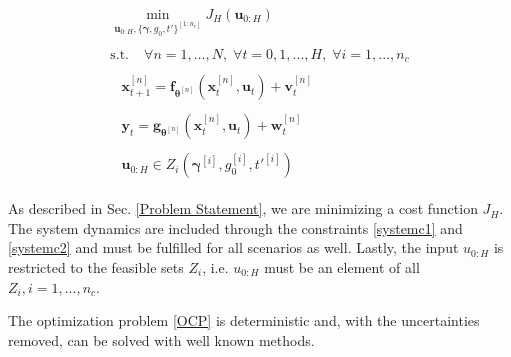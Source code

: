\begin{subequations}
\begin{align}
\begin{split}
\min\limits_{\boldsymbol{u}_{0:H}, \{ \boldsymbol{\gamma}, g_0, t' \}^{[1:n_c]} }  J_H(\boldsymbol{u}_{0:H})
\end{split}\\
\begin{split}
\text{s.t.}\; &\forall n = 1,...,N, \;  \forall t = 0,1,...,H,\; \forall i = 1,...,n_c
\end{split}\\
\begin{split}\label{systemc1}
&\boldsymbol{x}_{t+1}^{[n]} = \boldsymbol{f}_{\boldsymbol{\theta}^{[n]}} \left( \boldsymbol{x}_{t}^{[n]} , \boldsymbol{u}_t \right) + \boldsymbol{v}_{t}^{[n]}
\end{split}\\
\begin{split}\label{systemc2}
&\boldsymbol{y}_{t} = \boldsymbol{g}_{\boldsymbol{\theta}^{[n]}} \left( \boldsymbol{x}_{t}^{[n]}, \boldsymbol{u}_t \right) + \boldsymbol{w}_{t}^{[n]}
\end{split}\\
\begin{split}
 &\boldsymbol{u}_{0:H} \in Z_i(\boldsymbol{\gamma}^{[i]}, g_0^{[i]}, t'^{[i]})
\end{split}
\end{align}
\label{OCP_final}
\end{subequations}

As described in Sec. \ref{Problem Statement}, we are minimizing a cost function $J_H$. The system dynamics are included through the constraints \ref{systemc1} and \ref{systemc2} and must be fulfilled for all scenarios as well. Lastly, the input $u_{0:H}$ is restricted to the feasible sets $Z_i$, i.e. $u_{0:H}$ must be an element of all $Z_i, i = 1,...,n_c$.

The optimization problem \ref{OCP} is deterministic and, with the uncertainties removed, can be solved with well known methods. 




